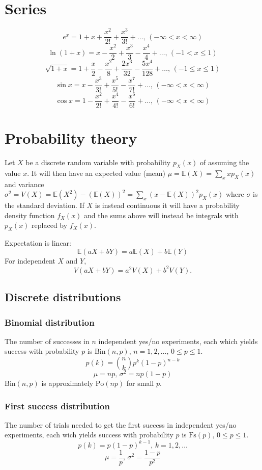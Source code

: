 \documentclass[11pt]{article}
\begin{document}
\begin{multicols}{3}
\section{Series} 
$$e^x = 1+x+\frac{x^2}{2!}+\frac{x^3}{3!}+\dots,\,(-\infty<x<\infty)$$
$$\ln(1+x) = x-\frac{x^2}{2}+\frac{x^3}{3}-\frac{x^4}{4}+\dots,\,(-1<x\leq1)$$
$$\sqrt{1+x} = 1+\frac{x}{2}-\frac{x^2}{8}+\frac{2x^3}{32}-\frac{5x^4}{128}+\dots,\,(-1\leq x\leq1)$$
$$\sin x = x-\frac{x^3}{3!}+\frac{x^5}{5!}-\frac{x^7}{7!}+\dots,\,(-\infty<x<\infty)$$
$$\cos x = 1-\frac{x^2}{2!}+\frac{x^4}{4!}-\frac{x^6}{6!}+\dots,\,(-\infty<x<\infty)$$

\section{Probability theory}
Let $X$ be a discrete random variable with probability $p_X(x)$ of assuming the value $x$. It will then have an expected value (mean) $\mu=\mathbb{E}(X)=\sum_xxp_X(x)$ and variance $\sigma^2=V(X)=\mathbb{E}(X^2)-(\mathbb{E}(X))^2=\sum_x(x-\mathbb{E}(X))^2p_X(x)$ where $\sigma$ is the standard deviation. If $X$ is instead continuous it will have a probability density function $f_X(x)$ and the sums above will instead be integrals with $p_X(x)$ replaced by $f_X(x)$.

Expectation is linear:
\[\mathbb{E}(aX+bY) = a\mathbb{E}(X)+b\mathbb{E}(Y)\]
For independent $X$ and $Y$, \[V(aX+bY) = a^2V(X)+b^2V(Y).\]

\subsection{Discrete distributions}

\subsubsection{Binomial distribution}
The number of successes in $n$ independent yes/no experiments, each which yields success with probability $p$ is $\textrm{Bin}(n,p),\,n=1,2,\dots,\, 0\leq p\leq1$.
\[p(k)=\binom{n}{k}p^k(1-p)^{n-k}\]
\[\mu = np,\,\sigma^2=np(1-p)\]
$\textrm{Bin}(n,p)$ is approximately $\textrm{Po}(np)$ for small $p$.

\subsubsection{First success distribution}
The number of trials needed to get the first success in independent yes/no experiments, each wich yields success with probability $p$ is $\textrm{Fs}(p),\,0\leq p\leq1$.
\[p(k)=p(1-p)^{k-1},\,k=1,2,\dots\]
\[\mu = \frac1p,\,\sigma^2=\frac{1-p}{p^2}\]


\end{multicols}
\end{document}
